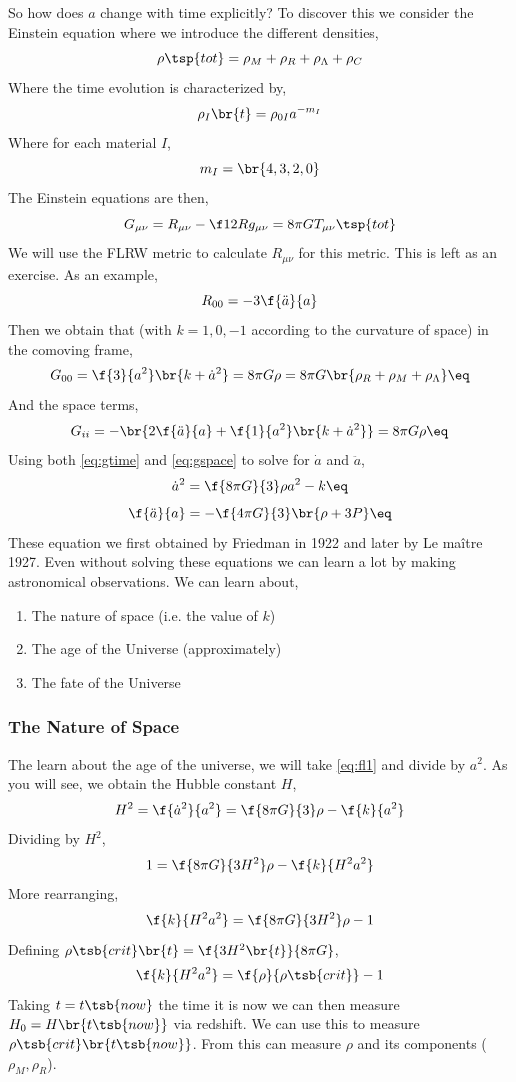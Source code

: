 \documentclass{article}
\begin{document}
So how does $a$ change with time explicitly? To discover this we consider the Einstein equation where we introduce the different densities,
\[ \rho\tsp{tot} = \rho_M + \rho_R + \rho_{\Lambda} + \rho_C \]
Where the time evolution is characterized by,
\[ \rho_{I}\br{t} = \rho_{0I} a^{-m_I} \]
Where for each material $I$,
\[ m_I = \br{4,3,2,0} \]
The Einstein equations are then,
\[ G_{\mu\nu} = R_{\mu\nu} - \f12 R g_{\mu\nu} = 8 \pi G T_{\mu\nu}\tsp{tot} \]
We will use the FLRW metric to calculate $R_{\mu\nu}$ for this metric. This is left as an exercise. As an example,
\[ R_{00} = - 3 \f{\ddot{a}}{a} \]
Then we obtain that (with $k = 1, 0, -1$ according to the curvature of space) in the comoving frame,
\[ G_{00} = \f{3}{a^2} \br{k + \dot{a}^2} = 8 \pi G \rho = 8\pi G \br{\rho_R + \rho_M + \rho_{\Lambda}} \eq \label{eq:gtime}\]
And the space terms,
\[ G_{ii} = - \br{2 \f{\ddot{a}}{a}  + \f{1}{a^2}\br{k + \dot{a}^2}} = 8 \pi G \rho  \eq \label{eq:gspace}\]
Using both \eqref{eq:gtime} and \eqref{eq:gspace} to solve for $\dot{a}$ and $\ddot{a}$,
\[ \dot{a}^2 = \f{8\pi G}{3} \rho a^2 - k \eq \label{eq:fl1}\]
\[ \f{\ddot{a}}{a} = -\f{4\pi G}{3} \br{\rho + 3 P} \eq \label{eq:fl2}\]
These equation we first obtained by Friedman in 1922 and later by Le maître 1927. Even without solving these equations we can learn a lot by making astronomical observations. We can learn about,
\begin{enumerate}
    \item The nature of space (i.e. the value of $k$)
    \item The age of the Universe (approximately)
    \item The fate of the Universe
\end{enumerate}
\subsubsection{The Nature of Space}
The learn about the age of the universe, we will take \eqref{eq:fl1} and divide by $a^2$. As you will see, we obtain the Hubble constant $H$,
\[ H^2 = \f{\dot{a}^2}{a^2} = \f{8\pi G}{3} \rho - \f{k}{a^2} \]
Dividing by $H^2$,
\[ 1 = \f{8\pi G}{3 H^2} \rho - \f{k}{H^2 a^2} \]
More rearranging,
\[ \f{k}{H^2 a^2} = \f{8\pi G}{3 H^2} \rho - 1 \]
Defining $\rho\tsb{crit}\br{t} = \f{3 H^2\br{t}}{8\pi G}$,
\[ \f{k}{H^2 a^2} = \f{\rho}{\rho\tsb{crit}} - 1 \]
Taking $t = t\tsb{now}$ the time it is now we can then measure $H_0 = H\br{t\tsb{now}}$ via redshift. We can use this to measure $\rho\tsb{crit}\br{t\tsb{now}}$. From this can measure $\rho$ and its components ($\rho_M, \rho_R$). \\
\end{document}
